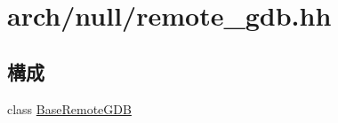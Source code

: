 \hypertarget{arch_2null_2remote__gdb_8hh}{
\section{arch/null/remote\_\-gdb.hh}
\label{arch_2null_2remote__gdb_8hh}
}
\subsection*{構成}
\begin{DoxyCompactItemize}
\item 
class \hyperlink{classBaseRemoteGDB}{BaseRemoteGDB}
\end{DoxyCompactItemize}
